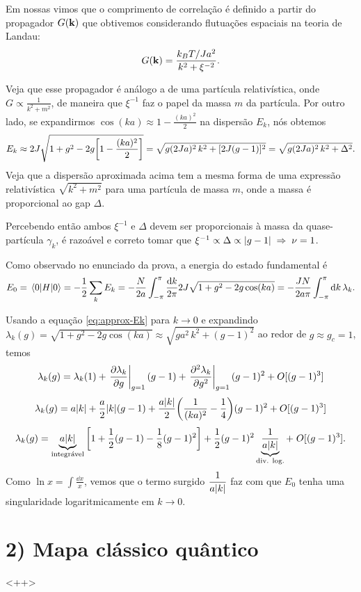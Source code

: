\documentclass[a4paper,10pt]{article}
\begin{document}
Em nossas vimos que o comprimento de correlação é definido a partir do propagador $G(\vb{k})$ que obtivemos considerando flutuações espaciais na teoria de Landau:
$$
G(\vb{k}) = \frac{k_B T / Ja^2}{k^2 + \xi^{-2}}.
$$

Veja que esse propagador é análogo a de uma partícula relativística, onde $G \propto \frac{1}{k^2 + m^2}$, de maneira que $\xi^{-1}$ faz o papel da massa $m$ da partícula. Por outro lado, se expandirmos $\cos(ka) \approx 1 - \frac{(ka)^2}{2}$ na dispersão $E_k$, nós obtemos
\begin{equation} \label{eq:approx-Ek}
E_k \approx 2J \sqrt{1 + g^2 - 2g \qty[1-\frac{(ka)^2}{2}]} =
\sqrt{g(2J a)^2 \, k^2 + [2J(g-1)]^2} = \sqrt{g(2J a)^2 \, k^2 + \Delta^2}.
\end{equation}
Veja que a dispersão aproximada acima tem a mesma forma de uma expressão relativística $\sqrt{k^2 + m^2}$ para uma partícula de massa $m$, onde a massa é proporcional ao gap $\Delta$.

\n

Percebendo então ambos $\xi^{-1}$ e $\Delta$ devem ser proporcionais à massa da quase-partícula $\gamma_k$, é razoável e correto tomar que $\xi^{-1} \propto \Delta \propto \abs{g-1} \; \Rightarrow \; \nu = 1$.

\n

Como observado no enunciado da prova, a energia do estado fundamental é
$$
E_0 = \ev{H}{0} = -\frac{1}{2} \sum_{k} E_k =
- \frac{N}{2a} \int_{-\pi}^{\pi} \frac{\dd{k}}{2\pi} 2J \sqrt{1 + g^2 - 2g\cos(ka)} =
- \frac{J N}{2a \pi} \int_{-\pi}^{\pi} \dd{k} \lambda_k.
$$

Usando a equação \ref{eq:approx-Ek} para $k\to 0$ e expandindo $\lambda_{k}(g) = \sqrt{1 + g^2 - 2g\cos(ka)} \approx \sqrt{ga^2 \, k^2 + (g-1)^2}$ ao redor de $g \approx g_c = 1$, temos
$$
\lambda_k(g) = \lambda_k(1) + \eval{\pdv{\lambda_k}{g}}_{g=1} (g-1) + \eval{\pdv[2]{\lambda_k}{g}}_{g=1} (g-1)^2 + O[(g-1)^3]
$$
$$
\lambda_k(g) = a\abs{k} + \frac{a}{2} \abs{k} (g-1) + \frac{a\abs{k}}{2} \qty(\frac{1}{(ka)^2} - \frac{1}{4}) (g-1)^2 + O[(g-1)^3]
$$
$$
\lambda_k(g) = \underbrace{a\abs{k}}_{\text{integrável}} \qty[1 + \frac{1}{2} (g-1) - \frac{1}{8} (g-1)^2 ] +
\frac{1}{2} (g-1)^2 \underbrace{\frac{1}{a\abs{k}}}_{\text{div. log.}} + \; O[(g-1)^3].
$$
Como $\ln x = \int \frac{\dd{x}}{x}$, vemos que o termo surgido $\displaystyle{\frac{1}{a\abs{k}}}$ faz com que $E_0$ tenha uma singularidade logaritmicamente em $k \to 0$.

\n

\section*{2) Mapa clássico quântico}

<++>



%
%
\end{document}
